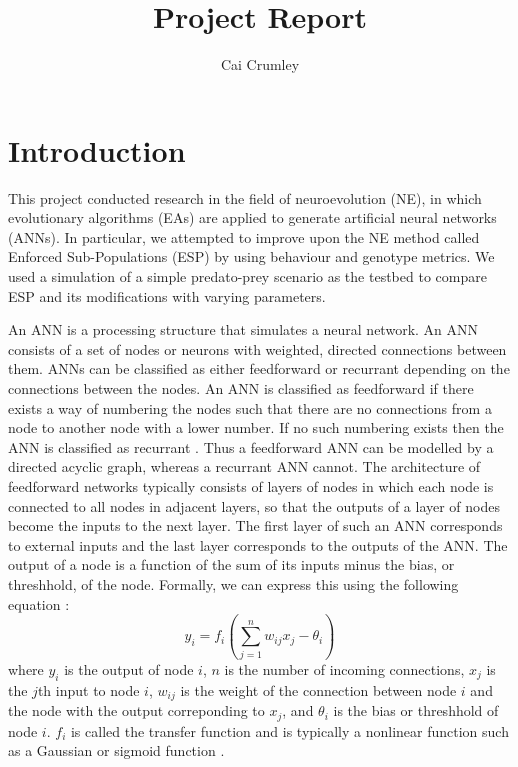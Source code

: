 \documentclass[12pt]{article} %
\title{Project Report}
\author{Cai Crumley}
\begin{document}
\maketitle

\section{Introduction}

This project conducted research in the field of neuroevolution (NE), in which evolutionary algorithms (EAs) are applied to generate artificial neural networks (ANNs). In particular, we attempted to improve upon the NE method called Enforced Sub-Populations (ESP) by using behaviour and genotype metrics. We used a simulation of a simple predato-prey scenario as the testbed to compare ESP and its modifications with varying parameters.

An ANN is a processing structure that simulates a neural network. An ANN consists of a set of nodes or neurons with weighted, directed connections between them. ANNs can be classified as either feedforward or recurrant depending on the connections between the nodes. An ANN is classified as feedforward if there exists a way of numbering the nodes such that there are no connections from a node to another node with a lower number. If no such numbering exists then the ANN is classified as recurrant \cite{Yao1999}. Thus a feedforward ANN can be modelled by a directed acyclic graph, whereas a recurrant ANN cannot.
The architecture of feedforward networks typically consists of layers of nodes in which each node is connected to all nodes in adjacent layers, so that the outputs of a layer of nodes become the inputs to the next layer. The first layer of such an ANN corresponds to external inputs and the last layer corresponds to the outputs of the ANN. The output of a node is a function of the sum of its inputs minus the bias, or threshhold, of the node. Formally, we can express this using the following equation \cite{Yao1999}:
\[
y_i = f_i \left(\sum_{j = 1} ^n w_{ij}x_j - \theta_i \right)
\]
where $y_i$ is the output of node $i$, $n$ is the number of incoming connections, $x_j$ is the $j$th input to node $i$, $w_{ij}$ is the weight of the connection between node $i$ and the node with the output correponding to $x_j$, and $\theta_i$ is the bias or threshhold of node $i$. $f_i$ is called the transfer function and is typically a nonlinear function such as a Gaussian or sigmoid function \cite{Yao1999}.
\end{document}
